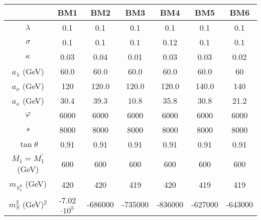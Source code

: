 \documentclass[12pt,a4paper]{article}
\begin{document}
\begin{table}
  \noindent \begin{tabular}{| c || c | c |c| c| c| c |}
\hline
                                  &    BM1                 &  BM2         &     BM3          &    BM4            &     BM5         &   BM6           \\
\hline
$\lambda$                         &    0.1                  & 0.1          & 	0.1           &    0.1             &    0.1              & 	0.1   \\
$\sigma$                          &    0.1                  & 0.1          &    0.1           &    0.12           & 	0.1              & 	0.1   \\
$\kappa$                          &    0.03                 & 0.04         & 	0.01           &    0.03            & 	0.03             & 	0.02  \\
$a_{\lambda}$ (GeV) 	          &    60.0                 & 60.0         & 	60.0            &   60.0             &  60.0             & 	60    \\
$a_{\sigma}$ (GeV) 	          &    120                  & 120.0        & 	120.0           &   120.0            & 	140.0             & 	140    \\
$a_{\kappa}$ (GeV) 	          &    30.4                 & 39.3         & 	10.8             &   35.8           &  	30.8             & 	21.2    \\
\hline
$\varphi$                         &    6000                 &  6000        & 	6000             &   6000          & 	6000             & 	6000   \\
$s$                   	         &     8000                 &  8000        & 	8000             &   8000          &    8000             & 	8000   \\
$\tan\theta$                     &      0.91                &  0.91        & 	0.91             &   0.91           & 	0.91             & 	0.91   \\
\hline
$M_1 = M_1^\prime$ (GeV) 	         &     600                  &   600         & 	600              &   600           & 	600    	 & 	600            \\
$m_{\chi_1^0}$ (GeV)                &    420                   & 	420         & 	419               &   420          &    419         & 	419            \\
\hline
$m_S^2$ (GeV)$^2$                     &    -7.02$\cdot 10^5$             & 	-686000     & 	-735000           &  -836000        & 	-627000     & 	-643000        \\

\end{tabular}
\end{table}
\end{document}
